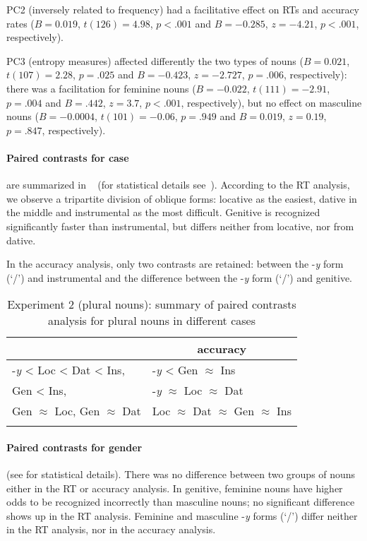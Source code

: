 \documentclass[output=paper, modfonts,newtxmath,hidelinks]{langscibook}
\begin{document}
PC2 (inversely related to frequency) had a facilitative effect on RTs and accuracy rates ($B= 0.019$, $t(126)= 4.98$, $p< .001$ and $B = -0.285$, $z= -4.21$, $p< .001$, respectively). 

PC3 (entropy measures) affected differently the two types of nouns ($B= 0.021$, $t(107)= 2.28$, $p= .025$ and $B = -0.423$, $z= -2.727$, $p= .006$, respectively): there was a facilitation for feminine nouns ($B= -0.022$, $t(111)= -2.91$, $p= .004$ and $B= .442$, $z= 3.7$, $p< .001$, respectively), but no effect on masculine nouns ($B= -0.0004$, $t(101)= -0.06$, $p= .949$ and $B= 0.019$, $z= 0.19$, $p= .847$, respectively).

\paragraph*{Paired contrasts for case} are summarized in ~ (for statistical details see~). According to the RT analysis, we observe a tripartite division of oblique forms: locative as the easiest, dative in the middle and instrumental as the most difficult. Genitive is recognized significantly faster than instrumental, but differs neither from locative, nor from dative. 

In the accuracy analysis, only two contrasts are retained: between the -\textit{y} form (`\nomm/\accc') and instrumental and the difference between the -\textit{y} form (`\nomm/\accc') and genitive.

\begin{table}
    \centering
	\caption{Experiment 2 (plural nouns): summary of paired contrasts analysis for plural nouns in different cases}
    \label{tab:casePlHierarchy}
    \begin{tabular}{*{2}l}
    \lsptoprule
    \multicolumn{1}{c}{RTs}	&	\multicolumn{1}{c}{accuracy}\\
    \midrule
    -\textit{y}	< Loc < Dat < Ins,	&	-\textit{y} < Gen $\approx$ Ins \\
    Gen < Ins,	&	-\textit{y} $\approx$ Loc $\approx$ Dat\\
    Gen $\approx$ Loc, Gen $\approx$ Dat & Loc $\approx$	Dat $\approx$ Gen $\approx$  Ins\\
    \lspbottomrule
    \end{tabular}
\end{table}    

\paragraph*{Paired contrasts for gender} (see  for statistical details). There was no difference between two groups of nouns either in the RT or accuracy analysis. In genitive, feminine  nouns have higher odds to be recognized incorrectly than masculine nouns; no significant difference shows up in the RT analysis. Feminine and masculine -\textit{y} forms (`\nomm/\accc') differ neither in the RT analysis, nor in the accuracy analysis. 
\end{document}
